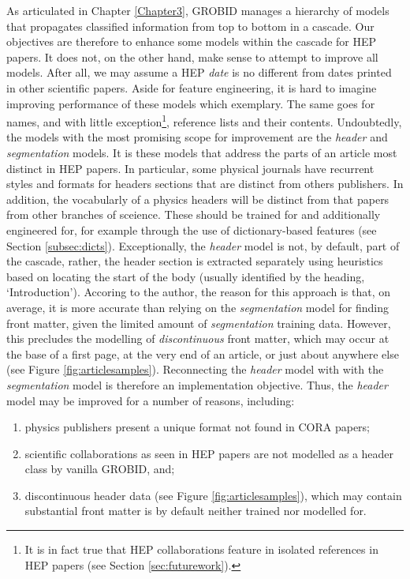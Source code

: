 As articulated in Chapter \ref{Chapter3}, GROBID manages a hierarchy of models that propagates classified information from top to bottom in a cascade. Our objectives are therefore to enhance some models within the cascade for HEP papers. It does not, on the other hand, make sense to attempt to improve all models. After all, we may assume a HEP \emph{date} is no different from dates printed in other scientific papers. Aside for feature engineering, it is hard to imagine improving performance of these models which exemplary. The same goes for names, and with little exception\footnote{It is in fact true that HEP collaborations feature in isolated references in HEP papers (see Section \ref{sec:futurework}).}, reference lists and their contents. Undoubtedly, the models with the most promising scope for improvement are the \emph{header} and \emph{segmentation} models. It is these models that address the parts of an article most distinct in HEP papers. In particular, some physical journals have recurrent styles and formats for headers sections that are distinct from others publishers. In addition, the vocabularly of a physics headers will be distinct from that papers from other branches of sceience. These should be trained for and additionally engineered for, for example through the use of dictionary-based features (see Section \ref{subsec:dicts}). Exceptionally, the \emph{header} model is not, by default, part of the cascade, rather, the header section is extracted separately using heuristics based on locating the start of the body (usually identified by the heading, `Introduction'). Accoring to the author, the reason for this approach is that, on average, it is more accurate than relying on the \emph{segmentation} model for finding front matter, given the limited amount of \emph{segmentation} training data. However, this precludes the modelling of \emph{discontinuous} front matter, which may occur at the base of a first page, at the very end of an article, or just about anywhere else (see Figure \ref{fig:articlesamples}). Reconnecting the \emph{header} model with with the \emph{segmentation} model is therefore an implementation objective. Thus, the \emph{header} model may be improved for a number of reasons, including:

\begin{enumerate}
\item physics publishers present a unique format not found in CORA papers;
\item scientific collaborations as seen in HEP papers are not modelled as a header class by vanilla GROBID, and;
\item discontinuous header data (see Figure \ref{fig:articlesamples}), which may contain substantial front matter is by default neither trained nor modelled for.
\end{enumerate}

